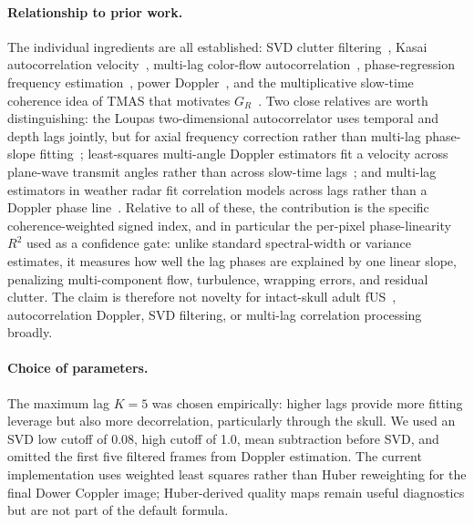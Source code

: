 \documentclass[11pt]{article}
\begin{document}
\paragraph{Relationship to prior work.}
The individual ingredients are all established: SVD clutter
filtering~\cite{demene2015svd}, Kasai autocorrelation
velocity~\cite{kasai1985autocorrelation}, multi-lag color-flow
autocorrelation~\cite{torp1994autocorrelation}, phase-regression
frequency estimation~\cite{tretter1985phaseregression,fitz1994frequency},
power Doppler~\cite{rubin1994powerdoppler}, and the multiplicative
slow-time coherence idea of TMAS that motivates
$G_R$~\cite{shen2022tmas}.  Two close relatives are worth
distinguishing: the Loupas two-dimensional autocorrelator uses temporal
and depth lags jointly, but for axial frequency correction rather than
multi-lag phase-slope fitting~\cite{loupas1995axial}; least-squares
multi-angle Doppler estimators fit a velocity across plane-wave transmit
angles rather than across slow-time
lags~\cite{yiu2016multiangle}; and multi-lag
estimators in weather radar fit correlation models across lags rather
than a Doppler phase line~\cite{lei2012multilag,warde2023gmle}.
Relative to all of these, the contribution is the specific
coherence-weighted signed index, and in particular the per-pixel
phase-linearity $R^2$ used as a confidence gate: unlike standard
spectral-width or variance estimates, it measures how well the lag
phases are explained by one linear slope, penalizing multi-component
flow, turbulence, wrapping errors, and residual clutter.  The claim is
therefore not novelty for intact-skull adult
fUS~\cite{vienneau2026adultskull}, autocorrelation Doppler, SVD
filtering, or multi-lag correlation processing broadly.

\paragraph{Choice of parameters.}
The maximum lag $K = 5$ was chosen empirically: higher lags provide
more fitting leverage but also more decorrelation, particularly
through the skull.  We used an SVD low cutoff of 0.08, high cutoff of
1.0, mean subtraction before SVD, and omitted the first five filtered
frames from Doppler estimation.  The current implementation uses
weighted least squares rather than Huber reweighting for the final
Dower Coppler image; Huber-derived quality maps remain useful
diagnostics but are not part of the default formula.
\end{document}
